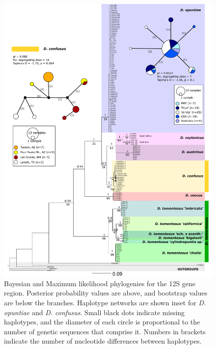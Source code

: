 \clearpage
\begin{figure}[H]
	\centering
	\includegraphics[scale =0.55]{Images/12S_MrBayes_2.pdf}
	\caption{Bayesian and Maximum likelihood phylogenies for the 12S gene region. Posterior probability values are above, and bootstrap values are below the branches. Haplotype networks are shown inset for \textit{D. opuntiae} and \textit{D. confusus}. Small black dots indicate missing haplotypes, and the diameter of each circle is proportional to the number of genetic sequences that comprise it. Numbers in brackets indicate the number of nucleotide differences between haplotypes.} 
	\label{fig:12S_tree}
\end{figure}

